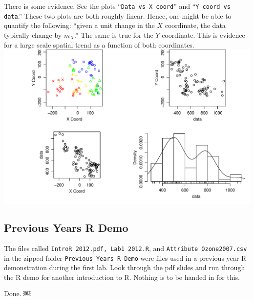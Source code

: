 \documentclass[letterpaper, 12pt]{article}\usepackage[]{graphicx}\usepackage[]{color}
\makeatletter
\def\maxwidth{ %
  \ifdim\Gin@nat@width>\linewidth
    \linewidth
  \else
    \Gin@nat@width
  \fi
}
\newenvironment{knitrout}{}{} %
\makeatother
\begin{document}
\begin{enumerate}[e.]
\textsf{
There is some evidence. See the plots ``\texttt{Data vs X coord}'' and ``\texttt{Y coord vs data}.'' These two plots are both roughly linear. Hence, one might be able to quantify the following: ``given a unit change in the $X$ coordinate, the data typically change by $m_X$.'' The same is true for the $Y$ coordinate. This is evidence for a large scale spatial trend as a function of both coordinates.
}
\begin{knitrout}
\color{fgcolor}
\includegraphics[width=\maxwidth]{figure/wolfcamp2} 

\end{knitrout}

\end{enumerate}
\subsection*{Previous Years R Demo}
The files called \texttt{IntroR 2012.pdf, Lab1 2012.R}, and \texttt{Attribute Ozone2007.csv} in the zipped folder \texttt{Previous Years R Demo} were files used in a previous year R demonstration during the first lab. Look through the pdf slides and run through the R demo for another introduction to R. Nothing is to be handed in for this.

\textsf{Done.}
￼
\end{document}
